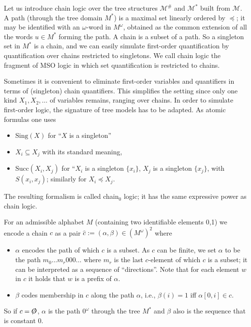 \documentclass[copyright,creativecommons]{eptcs}
\theoremstyle{plain}
\theoremstyle{nonumberplain}
\renewcommand{\emptyset}{\protect\raisebox{.15ex}{\ensuremath{\not}}\ensuremath{\mathnormal{O}}}
\newcommand{\m}{\ensuremath{\mathcal{M}}}
\newcommand{\Sing}{\ensuremath{\textrm{Sing}}}
\newcommand{\Succ}{\ensuremath{\textrm{Succ}}}
\newcommand{\Mweak}{\ensuremath{\m^{\#}}}
\newcommand{\Mstrong}{\ensuremath{\m^*}}
\begin{document}
Let us introduce chain logic over the tree structures $\Mweak$ and $\Mstrong$ 
built from $\m$.
A path (through the tree domain  
$M^*$) is a maximal set linearly ordered by $\preceq$; it may be identified with 
an $\omega$-word in $M^\omega$, obtained as the common extension of all 
the words $u \in M^*$ forming the path. A chain is a subset of a path. 
So a singleton set in $M^*$ is a chain, and we can easily simulate first-order quantification 
by quantification over chains restricted to singletons. We call chain logic the fragment 
of MSO logic in which set quantification is restricted to chains. 

Sometimes it is convenient to eliminate first-order variables and quantifiers in 
terms of (singleton) chain quantifiers. This simplifies the setting since only one 
kind $X_1, X_2, \ldots$ of variables remains, ranging over chains. 
In order to simulate first-order logic, the signature 
of tree models has to be adapted. As atomic formulas  one uses
\begin{itemize}
\item $\Sing(X)$ for ``$X$ is a singleton''
\item $X_i \subseteq X_j$ with its standard meaning,
\item $\Succ(X_i,X_j)$ for ``$X_i$ is a singleton $\{x_i\}$, $X_j$ is a singleton $\{x_j\}$, with $S(x_i,x_j)$;
similarly for $X_i \preceq X_j$. 
\end{itemize}
The resulting formalism is called chain$_0$ logic; it has the same expressive 
power as chain logic. 

 For an 
admissible alphabet $M$ (containing two identifiable elements 0,1) we 
encode a chain $c$ as a pair $\hat{c}:=(\alpha,\beta) \in (M^\omega)^2$ where 
  \begin{itemize}
    \item $\alpha$ encodes the path of which $c$ is a subset. As $c$ can be finite, we set $\alpha$ to be the path $m_0\ldots m_r 000\ldots$ where $m_r$ is the last $c$-element of which $c$ is a subset; it can be interpreted as a sequence of ``directions''. Note that for each element $w$ in $c$ it holds that $w$ is a prefix of $\alpha$.
    \item $\beta$ codes membership in $c$ along the path $\alpha$, i.e., $\beta(i)=1$ iff $\alpha[0,i] \in c$.
  \end{itemize}

So if $c = \emptyset$, $\alpha$ is the path $0^\omega$ through the tree $M^*$ and $\beta$ also is 
the sequence that is constant $0$. 
\end{document}
